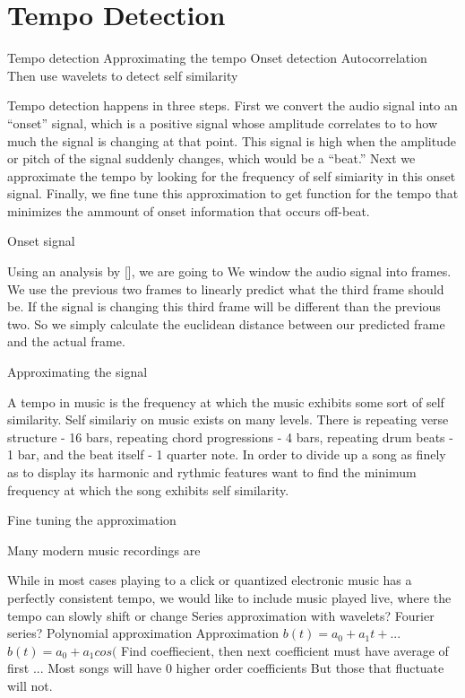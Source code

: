 \section{Tempo Detection}

Tempo detection
Approximating the tempo
Onset detection
Autocorrelation
Then use wavelets to detect self similarity

Tempo detection happens in three steps.
First we convert the audio signal into an ``onset'' signal, which is a positive signal whose amplitude correlates to to how much the signal is changing at that point. This signal is high when the amplitude or pitch of the signal suddenly changes, which would be a ``beat.''
Next we approximate the tempo by looking for the frequency of self simiarity in this onset signal.
Finally, we fine tune this approximation to get function for the tempo that minimizes the ammount of onset information that occurs off-beat.

Onset signal

Using an analysis by [], we are going to 
We window the audio signal into frames.
We use the previous two frames to linearly predict what the third frame should be.
If the signal is changing this third frame will be different than the previous two.
So we simply calculate the euclidean distance between our predicted frame and the actual frame.

Approximating the signal

A tempo in music is the frequency at which the music exhibits some sort of self similarity. Self similariy on music exists on many levels. There is repeating verse structure - 16 bars, repeating chord progressions - 4 bars, repeating drum beats - 1 bar, and the beat itself - 1 quarter note.
In order to divide up a song as finely as to display its harmonic and rythmic features want to find the minimum frequency at which the song exhibits self similarity. 

Fine tuning the approximation

Many modern music recordings are 

While in most cases playing to a click or quantized electronic music has a perfectly consistent tempo, we would like to include music played live, where the tempo can slowly shift or change
Series approximation with wavelets?
Fourier series?
Polynomial approximation
Approximation
$b(t) = a_0+a_1t+...$
$b(t) = a_0 + a_1cos($
Find coeffiecient, then next coefficient must have average of first ...
Most songs will have 0 higher order coefficients
But those that fluctuate will not.

